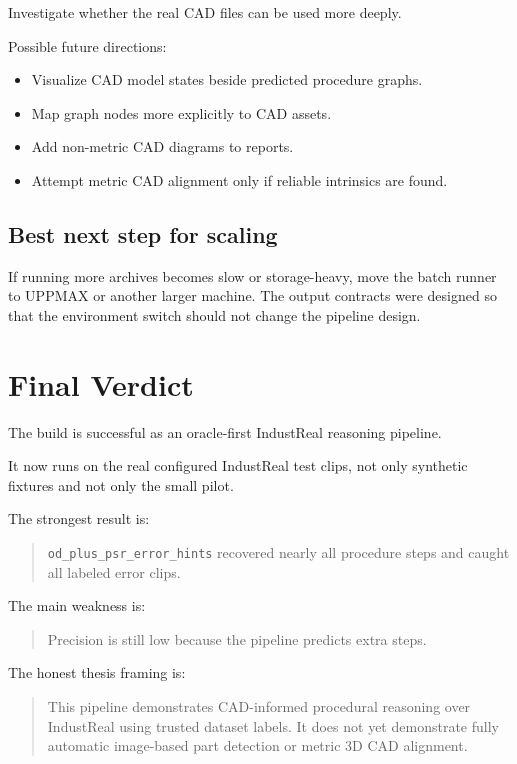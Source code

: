 \documentclass[11pt,a4paper]{article}
\begin{document}
Investigate whether the real CAD files can be used more deeply.

Possible future directions:

\begin{itemize}[leftmargin=*]
    \item Visualize CAD model states beside predicted procedure graphs.
    \item Map graph nodes more explicitly to CAD assets.
    \item Add non-metric CAD diagrams to reports.
    \item Attempt metric CAD alignment only if reliable intrinsics are found.
\end{itemize}

\subsection{Best next step for scaling}

If running more archives becomes slow or storage-heavy, move the batch runner to UPPMAX or another larger machine. The output contracts were designed so that the environment switch should not change the pipeline design.

\section{Final Verdict}

The build is successful as an oracle-first IndustReal reasoning pipeline.

It now runs on the real configured IndustReal test clips, not only synthetic fixtures and not only the small pilot.

The strongest result is:

\begin{quote}
\texttt{od\_plus\_psr\_error\_hints} recovered nearly all procedure steps and caught all labeled error clips.
\end{quote}

The main weakness is:

\begin{quote}
Precision is still low because the pipeline predicts extra steps.
\end{quote}

The honest thesis framing is:

\begin{quote}
This pipeline demonstrates CAD-informed procedural reasoning over IndustReal using trusted dataset labels. It does not yet demonstrate fully automatic image-based part detection or metric 3D CAD alignment.
\end{quote}
\end{document}
